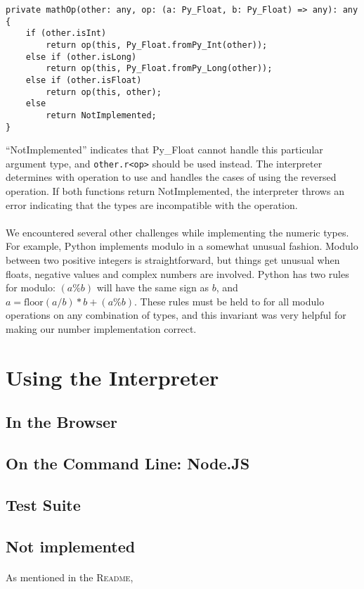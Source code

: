 \documentclass{article}
\begin{document}
\begin{verbatim}
private mathOp(other: any, op: (a: Py_Float, b: Py_Float) => any): any {
    if (other.isInt)
        return op(this, Py_Float.fromPy_Int(other));
    else if (other.isLong)
        return op(this, Py_Float.fromPy_Long(other));
    else if (other.isFloat)
        return op(this, other);
    else
        return NotImplemented;
}
\end{verbatim}

``NotImplemented'' indicates that Py\_Float cannot handle this particular argument type, and \texttt{other.r<op>} should be used instead. The interpreter determines with operation to use and handles the cases of using the reversed operation. If both functions return NotImplemented, the interpreter throws an error indicating that the types are incompatible with the operation.

\paragraph{}
We encountered several other challenges while implementing the numeric types. For example, Python implements modulo in a somewhat unusual fashion. Modulo between two positive integers is straightforward, but things get unusual when floats, negative values and complex numbers are involved. Python has two rules for modulo: $(a \% b)$ will have the same sign as $b$, and $a =  \mathrm{floor}(a / b) * b + (a \% b)$. These rules must be held to for all modulo operations on any combination of types, and this invariant was very helpful for making our number implementation correct.

\section{Using the Interpreter}

\subsection{In the Browser}

\subsection{On the Command Line: Node.JS}

\subsection{Test Suite}

\subsection{Not implemented}

\paragraph{}
As mentioned in the \textsc{Readme},


%
%

\end{document}

